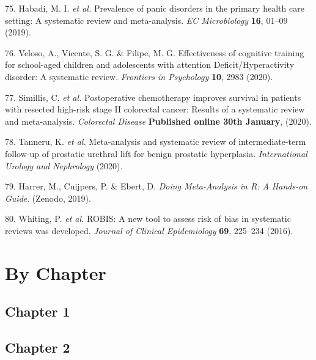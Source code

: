 \documentclass[a4paper, twoside]{templates/ociamthesis}
\begin{document}
\leavevmode\hypertarget{ref-habadi2019prevalence}{}%
75. Habadi, M. I. \emph{et al.} Prevalence of panic disorders in the primary health care setting: A systematic review and meta-analysis. \emph{EC Microbiology} \textbf{16}, 01--09 (2019).

\leavevmode\hypertarget{ref-veloso2020effectiveness}{}%
76. Veloso, A., Vicente, S. G. \& Filipe, M. G. Effectiveness of cognitive training for school-aged children and adolescents with attention Deficit/Hyperactivity disorder: A systematic review. \emph{Frontiers in Psychology} \textbf{10}, 2983 (2020).

\leavevmode\hypertarget{ref-simillis2020}{}%
77. Simillis, C. \emph{et al.} Postoperative chemotherapy improves survival in patients with resected high-risk stage II colorectal cancer: Results of a systematic review and meta-analysis. \emph{Colorectal Disease} \textbf{Published online 30th January}, (2020).

\leavevmode\hypertarget{ref-tanneru2020}{}%
78. Tanneru, K. \emph{et al.} Meta-analysis and systematic review of intermediate-term follow-up of prostatic urethral lift for benign prostatic hyperplasia. \emph{International Urology and Nephrology} (2020).

\leavevmode\hypertarget{ref-mathias_harrer_2019_2551803}{}%
79. Harrer, M., Cuijpers, P. \& Ebert, D. \emph{Doing Meta-Analysis in R: A Hands-on Guide}. (Zenodo, 2019).

\leavevmode\hypertarget{ref-whiting2016robis}{}%
80. Whiting, P. \emph{et al.} ROBIS: A new tool to assess risk of bias in systematic reviews was developed. \emph{Journal of Clinical Epidemiology} \textbf{69}, 225--234 (2016).

\startappendices

\hypertarget{chapter-appendix-heading}{%
\chapter{By Chapter}\label{chapter-appendix-heading}}

\hypertarget{appendix-chapter-1}{%
\section{Chapter 1}\label{appendix-chapter-1}}

\hypertarget{appendix-chapter-2}{%
\section{Chapter 2}\label{appendix-chapter-2}}
\end{document}
